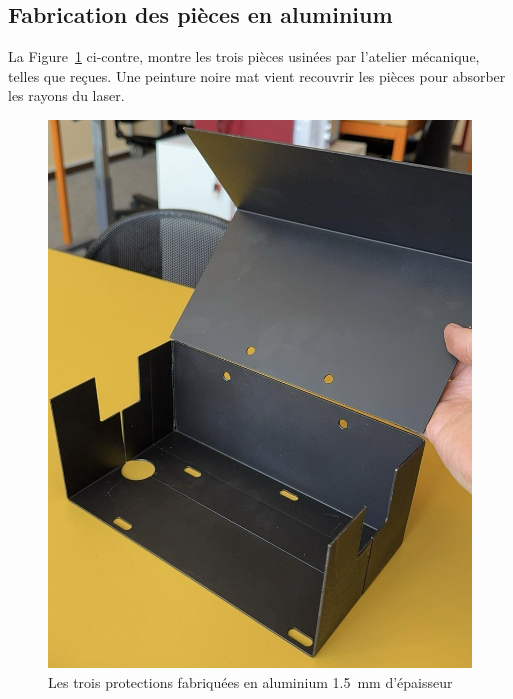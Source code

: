 \subsection{Fabrication des pièces en aluminium}
\begin{minipage}{\textwidth}

    \begin{minipage}[c]{0.6\textwidth}
        La Figure~\ref{capots_brutes} ci-contre, montre les trois pièces usinées par l'atelier mécanique, telles que reçues. Une peinture noire mat vient recouvrir les pièces pour absorber les rayons du laser.
    \end{minipage}\hfill
    \begin{minipage}[c]{0.35\textwidth}
        \begin{figure}[H]
            \centering
            \includegraphics[width=\textwidth]{assets/figures/Protections_laser/Securite_mecanique/Protection_entree_laser/capots_brutes.jpg}
            \caption{Les trois protections fabriquées en aluminium 1.5~mm d'épaisseur}
            \label{capots_brutes}
        \end{figure}
    \end{minipage}
\end{minipage}


